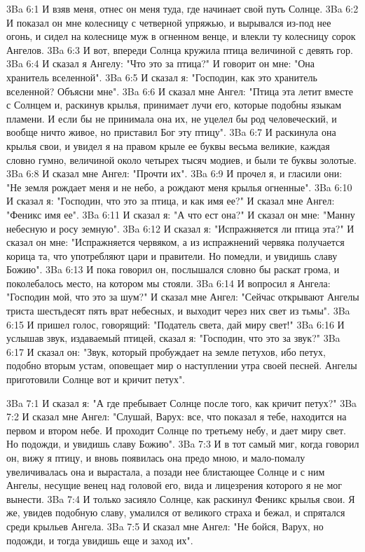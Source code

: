 \vs 3Ba 6:1
И взяв меня, отнес он меня туда, где начинает свой путь Солнце.
\vs 3Ba 6:2
И показал он мне колесницу с четверной упряжью, и вырывался из-под нее огонь, и сидел на колеснице муж в огненном венце, и влекли ту колесницу сорок Ангелов.
\vs 3Ba 6:3
И вот, впереди Солнца кружила птица величиной с девять гор.
\vs 3Ba 6:4
И сказал я Ангелу: "Что это за птица?" И говорит он мне: "Она хранитель вселенной".
\vs 3Ba 6:5
И сказал я: "Господин, как это хранитель вселенной? Объясни мне".
\vs 3Ba 6:6
И сказал мне Ангел: "Птица эта летит вместе с Солнцем и, раскинув крылья, принимает лучи его, которые подобны языкам пламени. И если бы не принимала она их, не уцелел бы род человеческий, и вообще ничто живое, но приставил Бог эту птицу".
\vs 3Ba 6:7
И раскинула она крылья свои, и увидел я на правом крыле ее буквы весьма великие, каждая словно гумно, величиной около четырех тысяч модиев, и были те буквы золотые.
\vs 3Ba 6:8
И сказал мне Ангел: "Прочти их".
\vs 3Ba 6:9
И прочел я, и гласили они: "Не земля рождает меня и не небо, а рождают меня крылья огненные".
\vs 3Ba 6:10
И сказал я: "Господин, что это за птица, и как имя ее?" И сказал мне Ангел: "Феникс имя ее".
\vs 3Ba 6:11
И сказал я: "А что ест она?" И сказал он мне: "Манну небесную и росу земную".
\vs 3Ba 6:12
И сказал я: "Испражняется ли птица эта?" И сказал он мне: "Испражняется червяком, а из испражнений червяка получается корица та, что употребляют цари и правители. Но помедли, и увидишь славу Божию".
\vs 3Ba 6:13
И пока говорил он, послышался словно бы раскат грома, и поколебалось место, на котором мы стояли.
\vs 3Ba 6:14
И вопросил я Ангела: "Господин мой, что это за шум?" И сказал мне Ангел: "Сейчас открывают Ангелы триста шестьдесят пять врат небесных, и выходит через них свет из тьмы".
\vs 3Ba 6:15
И пришел голос, говорящий: "Податель света, дай миру свет!"
\vs 3Ba 6:16
И услышав звук, издаваемый птицей, сказал я: "Господин, что это за звук?"
\vs 3Ba 6:17
И сказал он: "Звук, который пробуждает на земле петухов, ибо петух, подобно вторым устам, оповещает мир о наступлении утра своей песней. Ангелы приготовили Солнце вот и кричит петух".

\vs 3Ba 7:1
И сказал я: "А где пребывает Солнце после того, как кричит петух?"
\vs 3Ba 7:2
И сказал мне Ангел: "Слушай, Варух: все, что показал я тебе, находится на первом и втором небе. И проходит Солнце по третьему небу, и дает миру свет. Но подожди, и увидишь славу Божию".
\vs 3Ba 7:3
И в тот самый миг, когда говорил он, вижу я птицу, и вновь появилась она предо мною, и мало-помалу увеличивалась она и вырастала, а позади нее блистающее Солнце и с ним Ангелы, несущие венец над головой его, вида и лицезрения которого я не мог вынести.
\vs 3Ba 7:4
И только засияло Солнце, как раскинул Феникс крылья свои. Я же, увидев подобную славу, умалился от великого страха и бежал, и спрятался среди крыльев Ангела.
\vs 3Ba 7:5
И сказал мне Ангел: "Не бойся, Варух, но подожди, и тогда увидишь еще и заход их".

